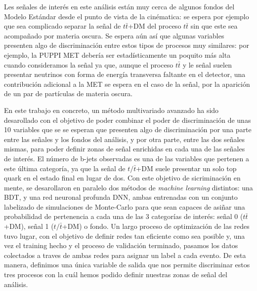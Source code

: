 \documentclass[a4paper, 10pt, openright]{report}
\begin{document}
\begin{appendices}
Les se\~{n}ales de inter\'{e}s en este an\'{a}lisis est\'{a}n muy cerca de algunos fondos del Modelo Est\'{a}ndar desde el punto de vista de la cin\'{e}matica: se espera por ejemplo que sea complicado separar la se\~{n}al de $t \bar t$+DM del proceso $t \bar t$ sin que este sea acompa\~{n}ado por materia oscura. Se espera a\'{u}n as\'{i} que algunas variables presenten algo de discriminaci\'{o}n entre estos tipos de procesos muy similares: por ejemplo, la \ac{PUPPI} \ac{MET} deber\'{i}a ser estad\'{i}sticamente un poquito m\'{a}s alta cuando consideramos la se\~{n}al ya que, aunque el proceso $t \bar t$ y le se\~{n}al suelen presentar neutrinos con forma de energ\'{i}a transversa faltante en el detector, una contribuci\'{o}n adicional a la \ac{MET} se espera en el caso de la se\~{n}al, por la aparici\'{o}n de un par de part\'{i}culas de materia oscura.

En este trabajo en concreto, un m\'{e}todo multivariado avanzado ha sido desarollado con el objetivo de poder combinar el poder de discriminaci\'{o}n de unas 10 variables que se se esperan que presenten algo de discriminaci\'{o}n por una parte entre las se\~{n}ales y los fondos del an\'{a}lisis, y por otra parte, entre las dos se\~{n}ales mismas, para poder definir zonas de se\~{n}al enrichidas en cada una de las se\~{n}ales de inter\'{e}s. El n\'{u}mero de b-jets observadas es una de las variables que pertenen a este \'{u}ltima categor\'{i}a, ya que la se\~{n}al de $t/\bar t$+DM suele presentar un solo top quark en el estado final en lugar de dos. Con este objetivo de sicriminaci\'{o}n en mente, se desarollaron en paralelo dos m\'{e}todos de \textit{machine learning} distintos: una \ac{BDT}, y una red neuronal profunda \ac{DNN}, ambas entrenadas con un conjunto labelizado de simulaciones de Monte-Carlo para que sean capaces de asi\~{n}ar una probabilidad de pertenencia a cada una de las 3 categor\'{i}as de inter\'{e}s: se\~{n}al 0 ($t \bar t$+DM), se\~{n}al 1 ($t/\bar t$+DM) o fondo. Un largo proceso de optimizaci\'{o}n de las redes tuvo lugar, con el objetivo de definir redes tan eficiente como sea posible y, una vez el training hecho y el proceso de validaci\'{o}n terminado, pasamos los datos colectados a traves de ambas redes para asignar un label a cada evento. De esta manera, definimos una \'{u}nica variable de salida que nos permite discriminar estos tres procesos con la cu\'{a}l hemos podido definir nuestras zonas de se\~{n}al del an\'{a}lisis.



\end{appendices}
\end{document}
